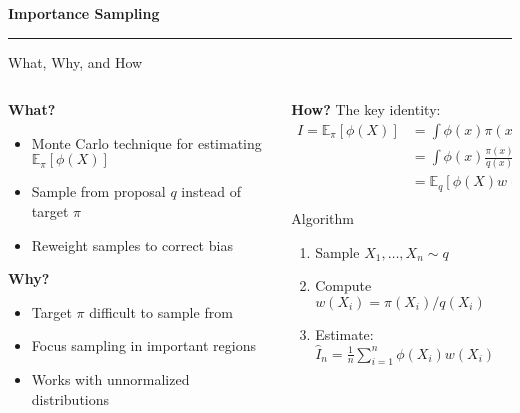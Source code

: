 \begin{frame}
	\vspace{2cm}
	\begin{center}
		{\Huge\textbf{\textcolor{copenhagenred}{Importance Sampling}}}
		\vspace{1cm}

		\rule{4cm}{3pt}
		\vspace{2cm}
	\end{center}
\end{frame}

\begin{frame}{What, Why, and How}
	\begin{columns}
		\begin{column}{0.48\textwidth}
			\textbf{What?}
			\begin{itemize}
				\item Monte Carlo technique for estimating $\mathbb{E}_\pi[\phi(X)]$
				\item Sample from proposal $q$ instead of target $\pi$
				\item Reweight samples to correct bias
			\end{itemize}

			\vspace{0.3cm}
			\textbf{Why?}
			\begin{itemize}
				\item Target $\pi$ difficult to sample from
				\item Focus sampling in important regions
				\item Works with unnormalized distributions
			\end{itemize}
		\end{column}

		\begin{column}{0.48\textwidth}
			\textbf{How?} The key identity:
			\begin{align*}
				I = \mathbb{E}_\pi[\phi(X)] & = \int \phi(x)\pi(x)dx              \\
				                        & = \int \phi(x)\frac{\pi(x)}{q(x)}q(x)dx \\
				                        & = \mathbb{E}_q[\phi(X)w(X)]
			\end{align*}

			\begin{block}{Algorithm}
				\begin{enumerate}
					\item Sample $X_1, \ldots, X_n \sim q$
					\item Compute $w(X_i) = \pi(X_i)/q(X_i)$
					\item Estimate: $\hat{I}_n = \frac{1}{n}\sum_{i=1}^n \phi(X_i)w(X_i)$
				\end{enumerate}
			\end{block}
		\end{column}
	\end{columns}
\end{frame}

